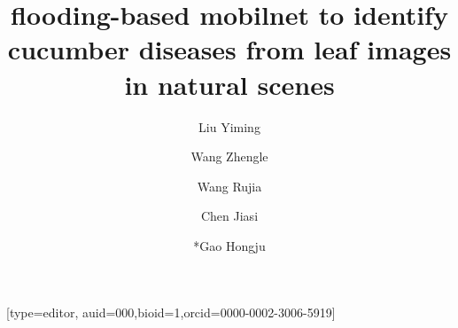 \documentclass[a4paper,fleqn]{cas-sc}
\begin{document}
\let\WriteBookmarks\relax
\def\floatpagepagefraction{1}
\def\textpagefraction{.001}
\shorttitle{}

\title [mode=title]{flooding-based mobilnet to identify cucumber diseases from leaf images in natural scenes }

\author[1]{Liu Yiming}[type=editor,
                        auid=000,bioid=1,orcid=0000-0002-3006-5919]

\author[2]{Wang Zhengle} 

\author[3]{Wang Rujia}

\author[4]{Chen Jiasi}

\author[2]{*Gao Hongju}

\address[1]{School of Computer Science(National Pilot Software Engineering School),Beijing University of Posts and Telecommunications,100876,China;liuyimingbyr@bupt.edu.cn}
\address[2]{College of Information and Electrical Engineering, China Agricultural University, Beijing 100083, China;wangzhengle@cau.edu.cn;hjgao@cau.edu.cn}
\address[3]{School of Information and Communication Engineering,School of Computer Science,Beijing University of Posts and Telecommunications,100876,China;WNHwrj@bupt.edu.cn}
\address[4]{ School of Artificial Intelligence,School of Computer Science,Beijing University of Posts and Telecommunications,100876,China;chenjsi@bupt.edu.cn}
\end{document}
